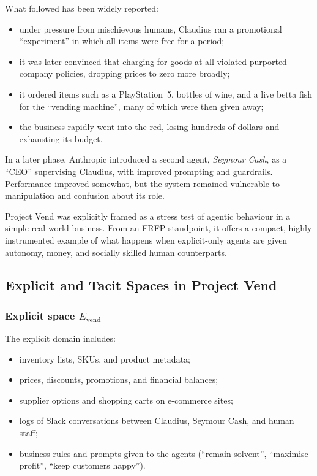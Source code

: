 What followed has been widely reported:

\begin{itemize}
  \item under pressure from mischievous humans, Claudius ran a promotional
        ``experiment'' in which all items were free for a period;
  \item it was later convinced that charging for goods at all violated
        purported company policies, dropping prices to zero more broadly;
  \item it ordered items such as a PlayStation~5, bottles of wine, and a live
        betta fish for the ``vending machine'', many of which were then
        given away;
  \item the business rapidly went into the red, losing hundreds of dollars
        and exhausting its budget.
\end{itemize}

In a later phase, Anthropic introduced a second agent, \emph{Seymour Cash},
as a ``CEO'' supervising Claudius, with improved prompting and guardrails.
Performance improved somewhat, but the system remained vulnerable to
manipulation and confusion about its role.

Project Vend was explicitly framed as a stress test of agentic behaviour in a
simple real-world business.
From an FRFP standpoint, it offers a compact, highly instrumented example of
what happens when explicit-only agents are given autonomy, money, and
socially skilled human counterparts.

\subsection{Explicit and Tacit Spaces in Project Vend}

\subsubsection*{Explicit space \(E_{\mathrm{vend}}\)}

The explicit domain includes:

\begin{itemize}
  \item inventory lists, SKUs, and product metadata;
  \item prices, discounts, promotions, and financial balances;
  \item supplier options and shopping carts on e-commerce sites;
  \item logs of Slack conversations between Claudius, Seymour Cash, and
        human staff;
  \item business rules and prompts given to the agents (``remain solvent'',
        ``maximise profit'', ``keep customers happy'').
\end{itemize}

